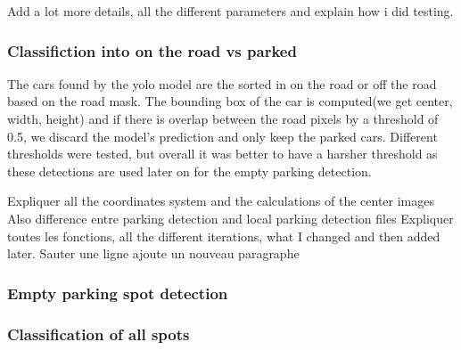 Add a lot more details, all the different parameters and explain how i did testing.

\subsubsection{Classifiction into on the road vs parked}
The cars found by the yolo model are the sorted in on the road or off the road based on the road mask.
The bounding box of the car is computed(we get center, width, height) and if there is overlap between the road pixels by a threshold of 0.5, we discard the model's prediction and only keep the parked cars.
Different thresholds were tested, but overall it was better to have a harsher threshold as these detections are used later on for the empty parking detection.

Expliquer all the coordinates system and the calculations of the center images
Also difference entre parking detection and local parking detection files
Expliquer toutes les fonctions, all the different iterations, what I changed and then added later.
Sauter une ligne ajoute un nouveau paragraphe

\subsubsection{Empty parking spot detection}



\subsubsection{Classification of all spots}

